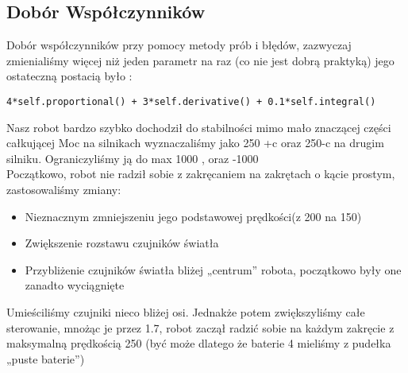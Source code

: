 \documentclass[paper=a4, fontsize=11pt]{scrartcl} %
\numberwithin{equation}{section} %
\numberwithin{figure}{section} %
\numberwithin{table}{section} %
\begin{document}
\subsection{Dobór Współczynników }
Dobór współczynników przy pomocy metody prób i błędów, zazwyczaj zmienialiśmy więcej niż jeden parametr na raz (co nie jest dobrą praktyką)  jego ostateczną postacią było : 
\begin{lstlisting}  
4*self.proportional() + 3*self.derivative() + 0.1*self.integral()  
\end{lstlisting}
Nasz robot bardzo szybko dochodził do stabilności mimo mało znaczącej części całkującej  
Moc na silnikach wyznaczaliśmy jako 250 +c oraz 250-c na drugim silniku. Ograniczyliśmy ją do max 1000 , oraz -1000\\
Początkowo, robot nie radził sobie z zakręcaniem na zakrętach o kącie prostym, zastosowaliśmy zmiany: 
\begin{itemize}  
\item Nieznacznym zmniejszeniu jego podstawowej prędkości(z 200 na 150)
\item Zwiększenie rozstawu czujników światła   
\item Przybliżenie czujników światła bliżej „centrum” robota, początkowo były one zanadto wyciągnięte  
\end{itemize}
 Umieściliśmy czujniki  nieco bliżej osi. 
Jednakże potem zwiększyliśmy całe sterowanie, mnożąc je przez 1.7, robot zaczął radzić sobie na każdym zakręcie z maksymalną prędkością 250 (być może dlatego że baterie 4 mieliśmy z pudełka „puste baterie”) 
\end{document}
